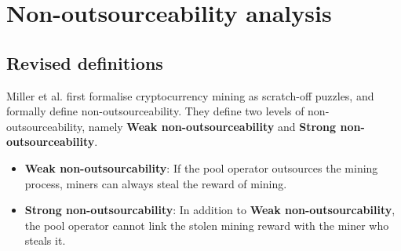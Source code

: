 \section{Non-outsourceability analysis}
\label{sec:non_outsourceability}



\subsection{Revised definitions}

Miller et al. \cite{miller2015nonoutsourceable} first formalise cryptocurrency mining as scratch-off puzzles, and formally define non-outsourceability.
They define two levels of non-outsourceability, namely \textbf{Weak non-outsourceability} and \textbf{Strong non-outsourceability}.

\begin{itemize}
    \item \textbf{Weak non-outsourcability}: If the pool operator outsources the mining process, miners can always steal the reward of mining.
    \item \textbf{Strong non-outsourcability}: In addition to \textbf{Weak non-outsourcability}, the pool operator cannot link the stolen mining reward with the miner who steals it.
\end{itemize}

